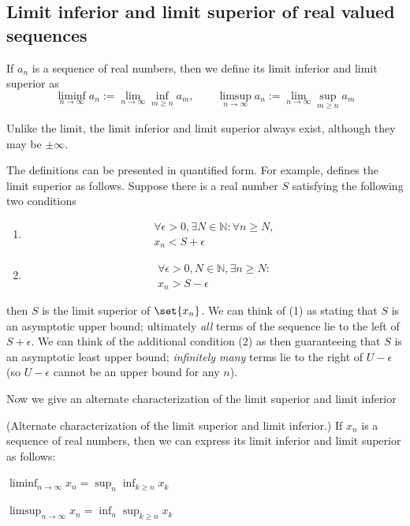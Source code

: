 \documentclass{article} %
\begin{document}
\subsection{Limit inferior and limit superior of real valued sequences}

\begin{definition}
If $a_n$ is a sequence of real numbers, then  we define its limit inferior and limit superior as 
\[ \liminf_{n \to \infty} a_n := \lim_{n \to \infty} \inf_{m \geq n} a_m, \quad \quad \limsup_{n \to \infty} a_n := \lim_{n \to \infty} \sup_{m \geq n} a_m \]	
\label{def:liminf_and_limsup}
\end{definition}

Unlike the limit, the limit inferior and limit superior always exist, although they may be $\pm \infty$.

\begin{remark}{}
The definitions can be presented in quantified form.  For example, \cite{apostol1974mathematical} defines the limit superior as follows. Suppose there is a real number $S$ satisfying the following two conditions
\begin{enumerate}
\item \begin{align*}
 \forall \epsilon > 0, \exists N \in \mathbb{N}: \forall n \geq N,\\
 x_n < S + \epsilon 	
 \end{align*}

\item \begin{align*}
 \forall \epsilon > 0, N \in \mathbb{N}, \exists n \geq N : \\
 x_n > S - \epsilon 	
 \end{align*}
\end{enumerate}
then $S$ is the limit superior of $\set{x_n}$.  We can think of (1) as stating that $S$ is an asymptotic upper bound;  ultimately \textit{all} terms of the sequence lie to the left of $S + \epsilon$.  We can think of the additional condition (2) as then guaranteeing that $S$ is an asymptotic least upper bound; \textit{infinitely many} terms lie to the right of $U - \epsilon$ (so $U - \epsilon$ cannot be an upper bound for any $n$). 
\end{remark}

Now we give an alternate characterization of the limit superior and limit inferior

\begin{proposition}{\textnormal{(Alternate characterization of the limit superior and limit inferior.)}} If $x_n$ is a sequence of real numbers, then we can express its limit inferior and limit superior as follows:
\begin{alphabate}
	
\item $\liminf_{n \to \infty} x_n = \sup_n \inf_{k \geq n} x_k$
\item $\limsup_{n \to \infty} x_n = \inf_n \sup_{k \geq n} x_k$ 
\end{alphabate}
\label{prop:alt_characterization_liminf_and_limsup}
\end{proposition}
\end{document}
